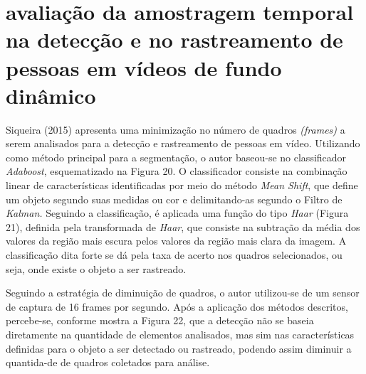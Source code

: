 \documentclass[12pt,oneside,a4paper,chapter=TITLE,section=TITLE,sumario=tradicional]{abntex2}
\begin{document}
\section{avaliação da amostragem temporal na detecção e no rastreamento de pessoas em vídeos de fundo dinâmico}
Siqueira (2015) apresenta uma minimização no número de quadros \textit{(frames)} a serem analisados para a detecção e rastreamento de pessoas em vídeo. Utilizando como método principal para a segmentação, o autor baseou-se no classificador \textit{Adaboost}, esquematizado na Figura 20. O classificador consiste na combinação linear de características identificadas por meio do método \textit{Mean Shift}, que define um objeto segundo suas medidas ou cor e delimitando-as segundo o Filtro de \textit{Kalman.}
Seguindo a classificação, é aplicada uma função do tipo \textit{Haar} (Figura 21), definida pela transformada de \textit{Haar}, que consiste na subtração da média dos valores da região mais escura pelos valores da região mais clara da imagem. A classificação dita forte se dá pela taxa de acerto nos quadros selecionados, ou seja, onde existe o objeto a ser rastreado.

\begin{figure}[htb]
\end{figure}

\begin{figure}[htb]
\end{figure}

Seguindo a estratégia de diminuição de quadros, o autor utilizou-se de um sensor de captura de 16 frames por segundo. Após a aplicação dos métodos descritos, percebe-se, conforme mostra a Figura 22, que a detecção não se baseia diretamente na quantidade de elementos analisados, mas sim nas características definidas para o objeto a ser detectado ou rastreado, podendo assim diminuir a quantida-de de quadros coletados para análise.

\begin{figure}[htb]
\end{figure}
\end{document}
